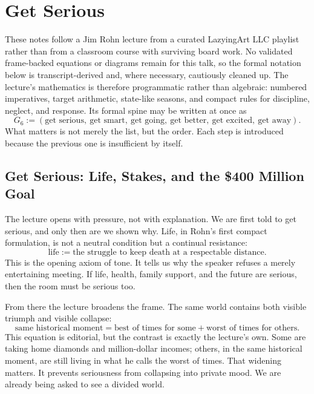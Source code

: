 \chapter{Get Serious}

These notes follow a Jim Rohn lecture from a curated LazyingArt LLC playlist rather than from a classroom course with surviving board work. No validated frame-backed equations or diagrams remain for this talk, so the formal notation below is transcript-derived and, where necessary, cautiously cleaned up. The lecture's mathematics is therefore programmatic rather than algebraic: numbered imperatives, target arithmetic, state-like seasons, and compact rules for discipline, neglect, and response. Its formal spine may be written at once as
\begin{equation}
G_6 := (\text{get serious},\ \text{get smart},\ \text{get going},\ \text{get better},\ \text{get excited},\ \text{get away}).
\end{equation}
What matters is not merely the list, but the order. Each step is introduced because the previous one is insufficient by itself.

\section{Get Serious: Life, Stakes, and the \$400 Million Goal}

The lecture opens with pressure, not with explanation. We are first told to get serious, and only then are we shown why. Life, in Rohn's first compact formulation, is not a neutral condition but a continual resistance:
\begin{equation}
\text{life} := \text{the struggle to keep death at a respectable distance}.
\end{equation}
This is the opening axiom of tone. It tells us why the speaker refuses a merely entertaining meeting. If life, health, family support, and the future are serious, then the room must be serious too.

From there the lecture broadens the frame. The same world contains both visible triumph and visible collapse:
\begin{equation}
\text{same historical moment} = \text{best of times for some} + \text{worst of times for others}.
\end{equation}
This equation is editorial, but the contrast is exactly the lecture's own. Some are taking home diamonds and million-dollar incomes; others, in the same historical moment, are still living in what he calls the worst of times. That widening matters. It prevents seriousness from collapsing into private mood. We are already being asked to see a divided world.

